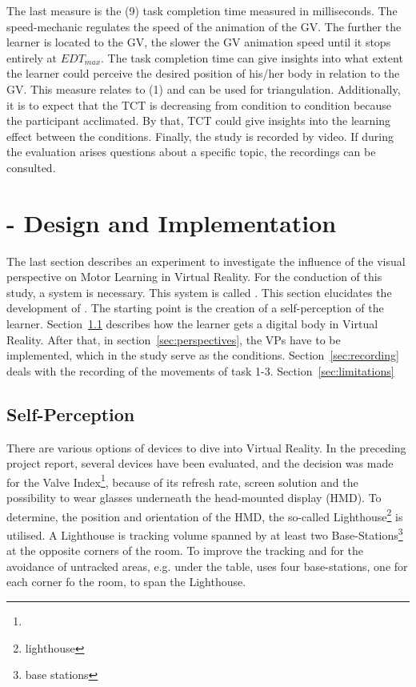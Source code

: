 The last measure is the (9) task completion time measured in milliseconds. The speed-mechanic regulates the speed of the animation of the GV. The further the learner is located to the GV, the slower the GV animation speed until it stops entirely at $EDT_{max}$. The task completion time can give insights into what extent the learner could perceive the desired position of his/her body in relation to the GV. This measure relates to (1) and can be used for triangulation.
Additionally, it is to expect that the TCT is decreasing from condition to condition because the participant acclimated. By that, TCT could give insights into the learning effect between the conditions. Finally, the study is recorded by video. If during the evaluation arises questions about a specific topic, the recordings can be consulted.

\section{\exgo - Design and Implementation}
\label{section:system}
The last section describes an experiment to investigate the influence of the visual perspective on Motor Learning in Virtual Reality. For the conduction of this study, a system is necessary. This system is called \exgo. This section elucidates the development of \exgo. The starting point is the creation of a self-perception of the learner. Section~\ref{sec:selfperception} describes how the learner gets a digital body in Virtual Reality. After that, in section~\ref{sec:perspectives}, the VPs have to be implemented, which in the study serve as the conditions. Section~\ref{sec:recording} deals with the recording of the movements of task 1-3. Section~\ref{sec:limitations}

\subsection{Self-Perception}
\label{sec:selfperception}
There are various options of devices to dive into Virtual Reality. In the preceding project report, several devices have been evaluated, and the decision was made for the Valve Index\footnote{}, because of its refresh rate, screen solution and the possibility to wear glasses underneath the head-mounted display (HMD). To determine, the position and orientation of the HMD, the so-called Lighthouse\footnote{lighthouse} is utilised. A Lighthouse is tracking volume spanned by at least two Base-Stations\footnote{base stations} at the opposite corners of the room. To improve the tracking and for the avoidance of untracked areas, e.g. under the table, \exgo uses four base-stations, one for each corner fo the room, to span the Lighthouse.\\

